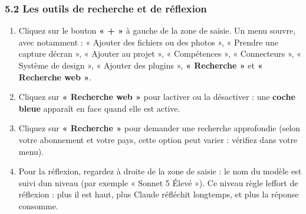 \documentclass[
  french,
  11pt,
  a4paper,
]{article}
\providecommand{\tightlist}{%
  \setlength{\itemsep}{0pt}\setlength{\parskip}{0pt}}
\begin{document}
\subsubsection{5.2 Les outils de recherche et de
réflexion}\label{52-les-outils-de-recherche-et-de-ruxe9flexion}

\begin{enumerate}
\def\labelenumi{\arabic{enumi}.}
\tightlist
\item
  Cliquez sur le bouton \textbf{« + »} à gauche de la zone de saisie. Un
  menu s\textquotesingle ouvre, avec notamment : « Ajouter des fichiers
  ou des photos », « Prendre une capture d\textquotesingle écran », «
  Ajouter au projet », « Compétences », « Connecteurs », « Système de
  design », « Ajouter des plugins », \textbf{« Recherche »} et \textbf{«
  Recherche web »}.
\item
  Cliquez sur \textbf{« Recherche web »} pour l\textquotesingle activer
  ou la désactiver : une \textbf{coche bleue} apparaît en face quand
  elle est active.
\item
  Cliquez sur \textbf{« Recherche »} pour demander une recherche
  approfondie (selon votre abonnement et votre pays, cette option peut
  varier : vérifiez dans votre menu).
\item
  Pour la réflexion, regardez à droite de la zone de saisie : le nom du
  modèle est suivi d\textquotesingle un niveau (par exemple « Sonnet 5
  Élevé »). Ce niveau règle l\textquotesingle effort de réflexion : plus
  il est haut, plus Claude réfléchit longtemps, et plus la réponse
  consomme.
\end{enumerate}
\end{document}
